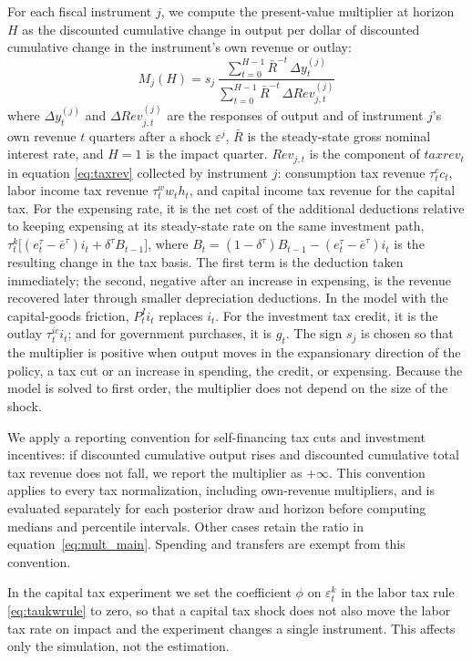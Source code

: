 \documentclass[article,11pt,letterpaper,fleqn]{article}
\theoremstyle{definition}
\numberwithin{equation}{section}
\begin{document}
For each fiscal instrument $j$, we compute the present-value multiplier at horizon $H$ as the discounted cumulative change in output per dollar of discounted cumulative change in the instrument's own revenue or outlay:
\begin{equation}\label{eq:mult_main}
M_j(H) = s_j\,\frac{\sum_{t=0}^{H-1} \bar{R}^{-t}\,\Delta y_t^{(j)}}{\sum_{t=0}^{H-1} \bar{R}^{-t}\,\Delta Rev_{j,t}^{(j)}}
\end{equation}
where $\Delta y_t^{(j)}$ and $\Delta Rev_{j,t}^{(j)}$ are the responses of output and of instrument $j$'s own revenue $t$ quarters after a shock $\varepsilon^j$, $\bar{R}$ is the steady-state gross nominal interest rate, and $H = 1$ is the impact quarter. $Rev_{j,t}$ is the component of $taxrev_t$ in equation \eqref{eq:taxrev} collected by instrument $j$: consumption tax revenue $\tau_t^c c_t$, labor income tax revenue $\tau_t^w w_t h_t$, and capital income tax revenue for the capital tax. For the expensing rate, it is the net cost of the additional deductions relative to keeping expensing at its steady-state rate on the same investment path, $\tau_t^k\bigl[(e_t^{\tau}-\bar{e}^{\tau})i_t + \delta^{\tau}B_{t-1}\bigr]$, where $B_t = (1-\delta^{\tau})B_{t-1} - (e_t^{\tau}-\bar{e}^{\tau})i_t$ is the resulting change in the tax basis. The first term is the deduction taken immediately; the second, negative after an increase in expensing, is the revenue recovered later through smaller depreciation deductions. In the model with the capital-goods friction, $P^I_t i_t$ replaces $i_t$. For the investment tax credit, it is the outlay $\tau_t^{ic} i_t$; and for government purchases, it is $g_t$. The sign $s_j$ is chosen so that the multiplier is positive when output moves in the expansionary direction of the policy, a tax cut or an increase in spending, the credit, or expensing. Because the model is solved to first order, the multiplier does not depend on the size of the shock.

We apply a reporting convention for self-financing tax cuts and investment incentives: if discounted cumulative output rises and discounted cumulative total tax revenue does not fall, we report the multiplier as $+\infty$. This convention applies to every tax normalization, including own-revenue multipliers, and is evaluated separately for each posterior draw and horizon before computing medians and percentile intervals. Other cases retain the ratio in equation~\eqref{eq:mult_main}. Spending and transfers are exempt from this convention.

In the capital tax experiment we set the coefficient $\phi$ on $\varepsilon_t^k$ in the labor tax rule \eqref{eq:taukwrule} to zero, so that a capital tax shock does not also move the labor tax rate on impact and the experiment changes a single instrument. This affects only the simulation, not the estimation.
\end{document}
